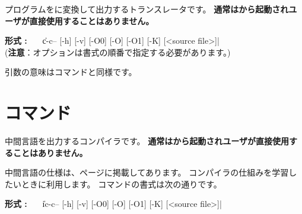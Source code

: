 {\cmm}プログラムを{\cl}に変換して出力するトランスレータです。
{\bf 通常は{\cmc}から起動されユーザが直接使用することはありません。}

\begin{flushleft}
{\bf 形式 : }~~~\|c-c-- [-h] [-v] [-O0] [-O] [-O1] [-K] [<source file>]|\\
({\bf 注意}：オプションは書式の順番で指定する必要があります。)
\end{flushleft}


引数の意味は{\cmmc}コマンドと同様です。




\section{{\icmmc}コマンド}
\label{command:icmmc}

中間言語を出力する{\cmm}コンパイラです。
{\bf 通常は{\cmi}から起動されユーザが直接使用することはありません。}

中間言語の仕様は、\pageref{app:vm}ページに掲載してあります。
コンパイラの仕組みを学習したいときに利用します。
{\icmmc}コマンドの書式は次の通りです。

\begin{flushleft}
{\bf 形式 : }~~~\|ic-c-- [-h] [-v] [-O0] [-O] [-O1] [-K] [<source file>]|
\end{flushleft}

